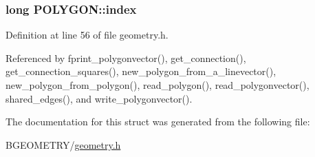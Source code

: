 \hypertarget{struct_p_o_l_y_g_o_n_afb5c12ae7531477e5e40bacd86502ebb}{
\subsubsection[{index}]{\setlength{\rightskip}{0pt plus 5cm}long P\-O\-L\-Y\-G\-O\-N\-::index}}\label{struct_p_o_l_y_g_o_n_afb5c12ae7531477e5e40bacd86502ebb}


Definition at line 56 of file geometry.\-h.



Referenced by fprint\-\_\-polygonvector(), get\-\_\-connection(), get\-\_\-connection\-\_\-squares(), new\-\_\-polygon\-\_\-from\-\_\-a\-\_\-linevector(), new\-\_\-polygon\-\_\-from\-\_\-polygon(), read\-\_\-polygon(), read\-\_\-polygonvector(), shared\-\_\-edges(), and write\-\_\-polygonvector().



The documentation for this struct was generated from the following file\-:\begin{DoxyCompactItemize}
\item 
B\-G\-E\-O\-M\-E\-T\-R\-Y/\hyperlink{geometry_8h}{geometry.\-h}\end{DoxyCompactItemize}
